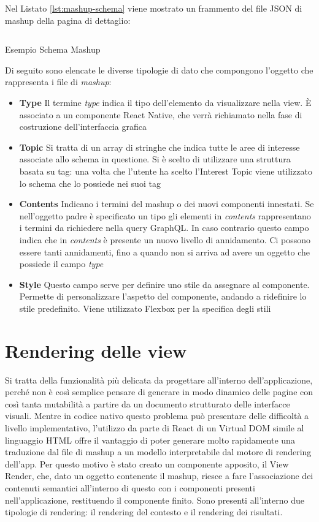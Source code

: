 Nel Listato \ref{lst:mashup-schema} viene mostrato un frammento del file JSON di mashup della pagina di dettaglio:

\begin{listing}[H]
	\inputminted{json}{6-implementazione-app/Codice/mashup-schema-example-app.json}
	\caption{Esempio Schema Mashup}
	\label{lst:mashup-schema}
\end{listing}

Di seguito sono elencate le diverse tipologie di dato che compongono l'oggetto che rappresenta i file di \emph{mashup}:

\begin{itemize}
	\item \textbf{Type}
	Il termine \emph{type} indica il tipo dell'elemento da visualizzare nella view. È associato a un componente React Native, che verrà richiamato nella fase di costruzione dell'interfaccia grafica
	\item \textbf{Topic}
	Si tratta di un array di stringhe che indica tutte le aree di interesse associate allo schema in questione. Si è scelto di utilizzare una struttura basata su tag: una volta che l’utente ha scelto l’Interest Topic viene utilizzato lo schema che lo possiede nei suoi tag 
	\item \textbf{Contents}
	Indicano i termini del mashup o dei nuovi componenti innestati. Se nell'oggetto padre è specificato un tipo gli elementi in \emph{contents} rappresentano i termini da richiedere nella query GraphQL. In caso contrario questo campo indica che in \emph{contents} è presente un nuovo livello di annidamento. Ci possono essere tanti annidamenti, fino a quando non si arriva ad avere un oggetto che possiede il campo \emph{type}
	\item \textbf{Style}
	Questo campo serve per definire uno stile da assegnare al componente. Permette di personalizzare l’aspetto del componente, andando a ridefinire lo stile predefinito. Viene utilizzato Flexbox per la specifica degli stili
\end{itemize}

\section{Rendering delle view}\label{sec:rendering-view}

Si tratta della funzionalità più delicata da progettare all'interno dell'applicazione, perché non è così semplice pensare di generare in modo dinamico delle pagine con così tanta mutabilità a partire da un documento strutturato delle interfacce visuali.
Mentre in codice nativo questo problema può presentare delle difficoltà a livello implementativo, l'utilizzo da parte di React di un Virtual DOM simile al linguaggio HTML offre il vantaggio di poter generare molto rapidamente una traduzione dal file di mashup a un modello interpretabile dal motore di rendering dell'app.
Per questo motivo è stato creato un componente apposito, il View Render, che, dato un oggetto contenente il mashup, riesce a fare l'associazione dei contenuti semantici all'interno di questo con i componenti presenti nell'applicazione, restituendo il componente finito.
Sono presenti all'interno due tipologie di rendering: il rendering del contesto e il rendering dei risultati.

